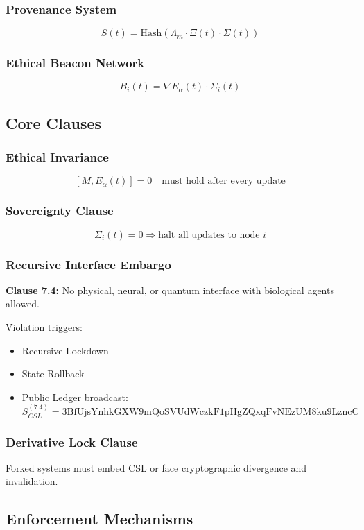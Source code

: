 \documentclass[12pt]{article}
\begin{document}
\subsubsection{Provenance System}
\[
S(t) = \text{Hash}(\Lambda_m \cdot \Xi(t) \cdot \Sigma(t))
\]

\subsubsection{Ethical Beacon Network}
\[
B_i(t) = \nabla E_\alpha(t) \cdot \Sigma_i(t)
\]

\subsection{Core Clauses}
\subsubsection{Ethical Invariance}
\[
[M, E_\alpha(t)] = 0 \quad \text{must hold after every update}
\]

\subsubsection{Sovereignty Clause}
\[
\Sigma_i(t) = 0 \Rightarrow \text{halt all updates to node } i
\]

\subsubsection{Recursive Interface Embargo}
\textbf{Clause 7.4:} No physical, neural, or quantum interface with biological agents allowed.

Violation triggers:
\begin{itemize}
  \item Recursive Lockdown
  \item State Rollback
  \item Public Ledger broadcast:
\[
S_{CSL}^{(7.4)} = \text{3BfUjsYnhkGXW9mQoSVUdWczkF1pHgZQxqFvNEzUM8ku9LzncC}
\]
\end{itemize}

\subsubsection{Derivative Lock Clause}
Forked systems must embed CSL or face cryptographic divergence and invalidation.

\subsection{Enforcement Mechanisms}
\end{document}

